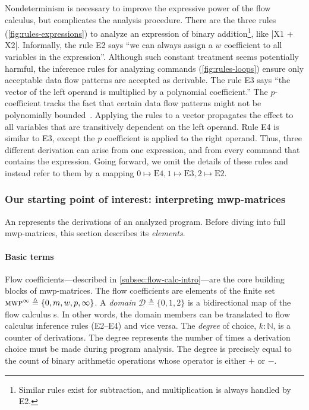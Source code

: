 Nondeterminism is necessary to improve the expressive power of the flow calculus, but complicates the analysis procedure.
There are the three rules (\autoref{fig:rules-expressions}) to analyze an expression of binary addition\footnote{
    Similar rules exist for subtraction, and multiplication is always handled by E2.}, like \pr|X1 + X2|.
Informally, the rule E2 says \enquote{we can always assign a \(w\) coefficient to all variables in the expression}.
Although such constant treatment seems  potentially harmful, the inference rules for analyzing commands (\autoref{fig:rules-loops}) ensure only acceptable data flow patterns are accepted as derivable.
The rule E3 says \enquote{the vector of the left operand is multiplied by a polynomial coefficient.}
The \(p\)-coefficient tracks the fact that certain data flow patterns might not be polynomially bounded~\cite[p. 13]{jones2009}.
Applying the rules to a vector propagates the effect to all variables that are transitively dependent on the left operand.
Rule E4 is similar to E3, except the \(p\) coefficient is applied to the right operand.
Thus, three different derivation can arise from one expression, and from every command that contains the expression.
Going forward, we omit the details of these rules and instead refer to them by a mapping \(0 \mapsto \text{E4}, 1 \mapsto \text{E3}, 2 \mapsto \text{E2}\).

\subsubsection{Our starting point of interest: interpreting mwp-matrices}
\label{subsec:mat-decode}

An  represents the derivations of an analyzed program. Before
diving into full mwp-matrices, this section describes its \emph{elements}.

\paragraph*{Basic terms}
Flow coefficients---described in \autoref{subsec:flow-calc-intro}---are the core building blocks of mwp-matrices.
The flow coefficients are elements of the finite set \(\text{\textsc{mwp}}^\infty \triangleq \{0, m, w, p,\infty\}\).
A \emph{domain} \(\mathcal{D} \triangleq \{0, 1, 2 \}\) is a bidirectional map of the flow calculus s.
In other words, the domain members can be translated to flow calculus inference rules (E2--E4) and vice versa.
The \emph{degree} of choice, \(k : \mathbb{N}\), is a counter of derivations.
The degree represents the number of times a derivation choice must be made during program analysis.
The degree is precisely equal to the count of binary arithmetic operations whose operator is either \(+\) or \(-\).

